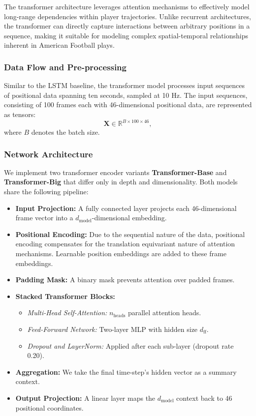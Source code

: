\documentclass[sigconf]{acmart}
\begin{document}
The transformer architecture leverages attention mechanisms to effectively model long-range dependencies within player trajectories. Unlike recurrent architectures, the transformer can directly capture interactions between arbitrary positions in a sequence, making it suitable for modeling complex spatial-temporal relationships inherent in American Football plays.

\subsubsection{Data Flow and Pre-processing}

Similar to the LSTM baseline, the transformer model processes input sequences of positional data spanning ten seconds, sampled at 10 Hz. The input sequences, consisting of 100 frames each with 46-dimensional positional data, are represented as tensors:
\[
\mathbf{X} \in \mathbb{R}^{B \times 100 \times 46},
\]
where \(B\) denotes the batch size.

\subsubsection{Network Architecture}

We implement two transformer encoder variants \textbf{Transformer-Base} and \textbf{Transformer-Big} that differ only in depth and dimensionality. Both models share the following pipeline:

\begin{itemize}
  \item \textbf{Input Projection:} A fully connected layer projects each 46-dimensional frame vector into a $d_{\text{model}}$-dimensional embedding.
  \item \textbf{Positional Encoding:} Due to the sequential nature of the data, positional encoding compensates for the translation equivariant nature of attention mechanisms. Learnable position embeddings are added to these frame embeddings.
  \item \textbf{Padding Mask:} A binary mask prevents attention over padded frames.
  \item \textbf{Stacked Transformer Blocks:} 
    \begin{itemize}
      \item \textit{Multi-Head Self-Attention:} $n_{\text{heads}}$ parallel attention heads.
      \item \textit{Feed-Forward Network:} Two-layer MLP with hidden size $d_{\text{ff}}$.
      \item \textit{Dropout and LayerNorm:} Applied after each sub-layer (dropout rate 0.20).
    \end{itemize}
  \item \textbf{Aggregation:} We take the final time-step’s hidden vector as a summary context.
  \item \textbf{Output Projection:} A linear layer maps the $d_{\text{model}}$ context back to 46 positional coordinates.
\end{itemize}
\end{document}
